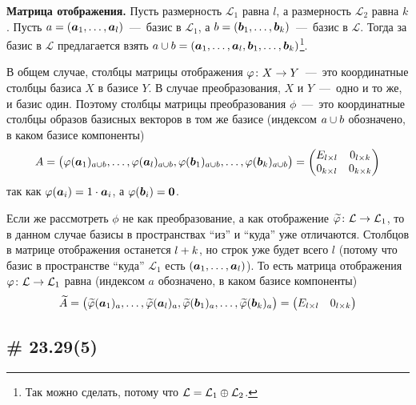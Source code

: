 \documentclass[a4paper,12pt]{article}
\begin{document}
\begin{solution}
    \medskip
    
    \textbf{Матрица отображения.} Пусть размерность $\mathcal L_1$ равна $l$, а размерность $\mathcal L_2$ равна $k$.
    Пусть $a \hm= (\bds a_1, \ldots, \bds a_l)$~---~базис в $\mathcal L_1$, а $b \hm= (\bds b_1, \ldots, \bds b_k)$~---~базис в $\mathcal L$.
    Тогда за базис в $\mathcal L$ предлагается взять $a \hm\cup b \hm= (\bds a_1, \ldots, \bds a_l, \bds b_1, \ldots, \bds b_k)$\footnote{Так можно сделать, потому что $\mathcal L \hm= \mathcal L_1 \hm\oplus \mathcal L_2$.}.
    
    В общем случае, столбцы матрицы отображения $\phi\colon X \hm\to Y$~---~это координатные столбцы базиса $X$ в базисе $Y$.
    В случае преобразования, $X$ и $Y$~---~одно и то же, и базис один.
    Поэтому столбцы матрицы преобразования $\phi$~---~это координатные столбцы образов базисных векторов в том же базисе (индексом $a \hm\cup b$ обозначено, в каком базисе компоненты)
    \[
      A = \bigl(\varphi(\boldsymbol a_1)_{a \cup b}, \ldots, \varphi(\boldsymbol a_l)_{a \cup b}, \varphi(\boldsymbol b_1)_{a \cup b}, \ldots, \varphi(\boldsymbol b_k)_{a \cup b}\bigr)
      = \begin{pmatrix}
        E_{l \times l} & 0_{l \times k}\\
        0_{k \times l} & 0_{k \times k}
      \end{pmatrix}
    \]
    так как $\phi(\bds a_i) \hm= 1 \hm\cdot \bds a_i$, а $\phi(\bds b_i) \hm= \bds 0$.
    
    Если же рассмотреть $\phi$ не как преобразование, а как отображение $\widetilde\phi\colon \mathcal L \hm\to \mathcal L_1$, то в данном случае базисы в пространствах ``из'' и ``куда'' уже отличаются.
    Столбцов в матрице отображения останется $l \hm+ k$, но строк уже будет всего $l$ (потому что базис в пространстве ``куда'' $\mathcal L_1$ есть $(\boldsymbol a_1, \ldots, \boldsymbol a_l)$).
    То есть матрица отображения $\phi\colon \mathcal L \hm\to \mathcal L_1$ равна (индексом $a$ обозначено, в каком базисе компоненты)
    \[
      \widetilde A = \bigl(\widetilde{\varphi}(\boldsymbol a_1)_{a}, \ldots, \widetilde{\varphi}(\boldsymbol a_l)_{a}, \widetilde{\varphi}(\boldsymbol b_1)_{a}, \ldots, \widetilde{\varphi}(\boldsymbol b_k)_{a}\bigr)
      = \begin{pmatrix}
        E_{l \times l} & 0_{l \times k}
      \end{pmatrix}
    \]
  \end{solution}
  
  
  \subsection{\# 23.29(5)}
  
\end{document}

